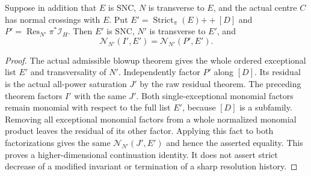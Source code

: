\begin{theorem}
\label{hir:sharp-actual-incident-centre-all-exceptional-residual}
\leanok
Suppose in addition that $E$ is SNC, $N$ is transverse to $E$, and the
actual centre $C$ has normal crossings with $E$.  Put
$E'=\operatorname{Strict}_\pi(E)\mathbin{+\!+}[D]$ and
$P'=\operatorname{Res}_{N'}\pi^*\mathcal I_H$.
Then $E'$ is SNC, $N'$ is transverse to $E'$, and
\[
 \mathcal N_{N'}(I',E')=\mathcal N_{N'}(P',E').
\]
\end{theorem}
\begin{proof}
The actual admissible blowup theorem gives the whole ordered exceptional
list $E'$ and transversality of $N'$.  Independently factor $P'$ along
$[D]$.  Its residual is the actual all-power saturation $J'$ by the raw
residual theorem.  The preceding theorem factors $I'$ with the same
$J'$.  Both single-exceptional monomial factors remain monomial with
respect to the full list $E'$, because $[D]$ is a subfamily.  Removing
all exceptional monomial factors from a whole normalized monomial
product leaves the residual of its other factor.  Applying this fact
to both factorizations gives the same $\mathcal N_{N'}(J',E')$ and hence
the asserted equality.  This proves a higher-dimensional continuation
identity.  It does not assert strict decrease of a modified invariant
or termination of a sharp resolution history.
\end{proof}

